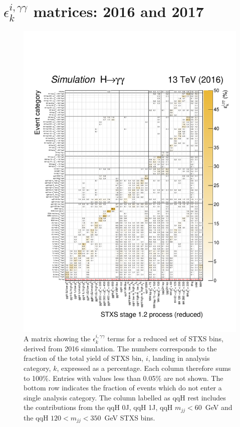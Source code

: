 \chapter{$\epsilon^{i,\gamma\gamma}_k$ matrices: 2016 and 2017}\label{app:eff_acc}

\begin{figure}[hptb]
  \centering
  \includegraphics[width=1\textwidth]{Figures/hgg_stats/migrationMatrix_2016_thesis.pdf}
  \caption[Efficiency times acceptance matrix from 2016 simulation]
  {
    A matrix showing the $\epsilon^{i,\gamma\gamma}_{k}$ terms for a reduced set of STXS bins, derived from 2016 simulation. The numbers corresponds to the fraction of the total yield of STXS bin, $i$, landing in analysis category, $k$, expressed as a percentage. Each column therefore sums to 100\%. Entries with values less than 0.05\% are not shown. The bottom row indicates the fraction of events which do not enter a single analysis category. The column labelled as qqH rest includes the contributions from the qqH 0J, qqH 1J, qqH $m_{jj}<60$~GeV and the qqH $120<m_{jj}<350$~GeV STXS bins.
  }
  \label{fig:ea_2016}
\end{figure}

